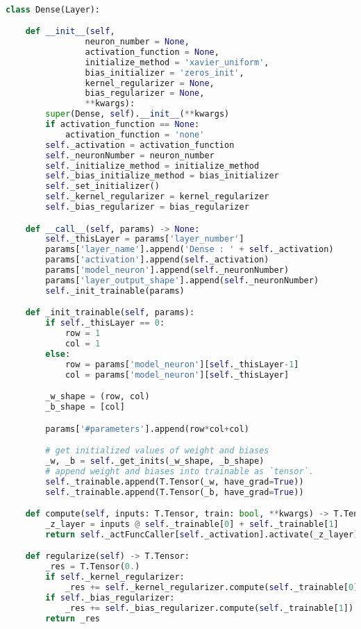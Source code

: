 \documentclass[12pt]{report}
\begin{document}
\begin{lstlisting}[language=Python, numbers=none, caption={Dense Layer implementation.}, label={lis:dense-layer-imp}]

class Dense(Layer):

	def __init__(self,
				neuron_number = None,
				activation_function = None,
				initialize_method = 'xavier_uniform',
				bias_initializer = 'zeros_init',
				kernel_regularizer = None,
				bias_regularizer = None,
				**kwargs):
		super(Dense, self).__init__(**kwargs)
		if activation_function == None:
			activation_function = 'none'
		self._activation = activation_function
		self._neuronNumber = neuron_number
		self._initialize_method = initialize_method
		self._bias_initialize_method = bias_initializer
		self._set_initializer()
		self._kernel_regularizer = kernel_regularizer
		self._bias_regularizer = bias_regularizer

	def __call__(self, params) -> None:
		self._thisLayer = params['layer_number']
		params['layer_name'].append('Dense : ' + self._activation)
		params['activation'].append(self._activation)
		params['model_neuron'].append(self._neuronNumber)
		params['layer_output_shape'].append(self._neuronNumber)
		self._init_trainable(params)

	def _init_trainable(self, params):
		if self._thisLayer == 0:
			row = 1
			col = 1
		else:
			row = params['model_neuron'][self._thisLayer-1]
			col = params['model_neuron'][self._thisLayer]

		_w_shape = (row, col)
		_b_shape = [col]

		params['#parameters'].append(row*col+col)

		# get initialized values of weight and biases
		_w, _b = self._get_inits(_w_shape, _b_shape)
		# append weight and biases into trainable as `tensor`.
		self._trainable.append(T.Tensor(_w, have_grad=True))
		self._trainable.append(T.Tensor(_b, have_grad=True))

	def compute(self, inputs: T.Tensor, train: bool, **kwargs) -> T.Tensor:
		_z_layer = inputs @ self._trainable[0] + self._trainable[1]
		return self._actFuncCaller[self._activation].activate(_z_layer)

	def regularize(self) -> T.Tensor:
		_res = T.Tensor(0.)
		if self._kernel_regularizer:
			_res += self._kernel_regularizer.compute(self._trainable[0])
		if self._bias_regularizer:
			_res += self._bias_regularizer.compute(self._trainable[1])
		return _res
\end{lstlisting}
\end{document}
